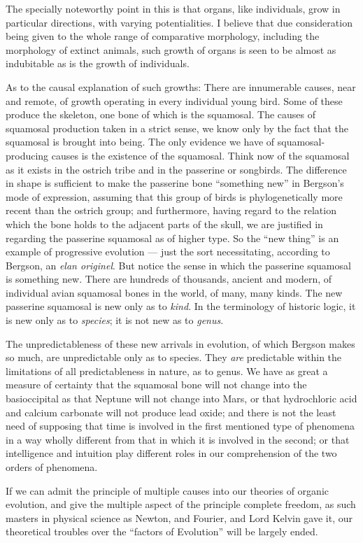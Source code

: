 \documentclass[a4paper, 11pt, oneside, polutonikogreek, english]{article}
\begin{document}
The specially noteworthy point in this is that organs, like individuals, grow in particular directions, with varying potentialities. I believe that due consideration being given to the whole range of comparative morphology, including the morphology of extinct animals, such growth of organs is seen to be almost as indubitable as is the growth of individuals.

As to the causal explanation of such growths: There are innumerable causes, near and remote, of growth operating in every individual young bird. Some of these produce the skeleton, one bone of which is the squamosal. The causes of squamosal production taken in a strict sense, we know only by the fact that the squamosal is brought into being. The only evidence we have of squamosal-producing causes is the existence of the squamosal. Think now of the squamosal as it exists in the ostrich tribe and in the passerine or songbirds. The difference in shape is sufficient to make the passerine bone ``something new'' in Bergson's mode of expression, assuming that this group of birds is phylogenetically more recent than the ostrich group; and furthermore, having regard to the relation which the bone holds to the adjacent parts of the skull, we are justified in regarding the passerine squamosal as of higher type. So the ``new thing'' is an example of progressive evolution --- just the sort necessitating, according to Bergson, an \emph{elan originel}. But notice the sense in which the passerine squamosal is something new. There are hundreds of thousands, ancient and modern, of individual avian squamosal bones in the world, of many, many kinds. The new passerine squamosal is new only as to \emph{kind}. In the terminology of historic logic, it is new only as to \emph{species}; it is not new as to \emph{genus}.

The unpredictableness of these new arrivals in evolution, of which Bergson makes so much, are unpredictable only as to species. They \emph{are} predictable within the limitations of all predictableness in nature, as to genus. We have as great a measure of certainty that the squamosal bone will not change into the basioccipital as that Neptune will not change into Mars, or that hydrochloric acid and calcium carbonate will not produce lead oxide; and there is not the least need of supposing that time is involved in the first mentioned type of phenomena in a way wholly different from that in which it is involved in the second; or that intelligence and intuition play different roles in our comprehension of the two orders of phenomena.

If we can admit the principle of multiple causes into our theories of organic evolution, and give the multiple aspect of the principle complete freedom, as such masters in physical science as Newton, and Fourier, and Lord Kelvin gave it, our theoretical troubles over the ``factors of Evolution'' will be largely ended.
\end{document}
